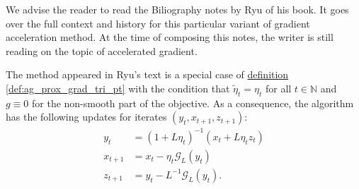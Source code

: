 \documentclass[12pt]{article}
\begin{document}
            \begin{remark}
                We advise the reader to read the Biliography notes by Ryu \cite[chapter 12]{ryu_large-scale_2022} of his book. 
                It goes over the full context and history for this particular variant of gradient acceleration method. 
                At the time of composing this notes, the writer is still reading on the topic of accelerated gradient.     
            \end{remark}

            \begin{definition}
            \label{def:ag_tri_pt_form_E}
                The method appeared in Ryu's text is a special case of 
                \hyperref[def:ag_prox_grad_tri_pt]{definition \ref*{def:ag_prox_grad_tri_pt}}
                with the condition that $\tilde \eta_t = \eta_t$ for all $t \in \mathbb N$ and $g \equiv 0$ for the non-smooth part of the objective. 
                As a consequence, the algorithm has the following updates for iterates $(y_t, x_{t + 1}, z_{t + 1})$: 
                \begin{align*}
                    y_t &= (1 + L\eta_t)^{-1}(x_t + L\eta_t z_t)
                    \\
                    x_{t + 1} &= x_t - \eta_t \mathcal G_L(y_t)
                    \\
                    z_{t + 1} &= y_t - L^{-1}\mathcal G_L(y_t).
                \end{align*}
            \end{definition}
\end{document}
